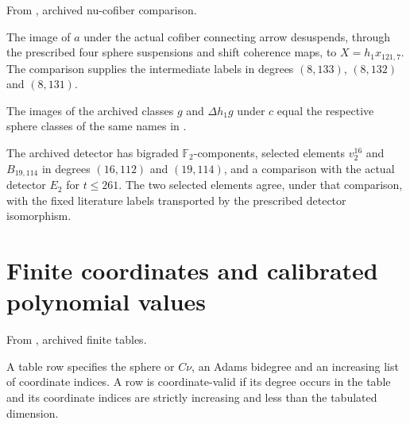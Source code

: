 \begin{theorem}
\label{sem:Computation:top-cell-comparison}
From \cite{LinProgram}, archived nu-cofiber comparison.\par
The image of $a$ under the actual cofiber connecting arrow desuspends, through the prescribed four sphere suspensions and shift coherence maps, to $X=h_1x_{121,7}$. The comparison supplies the intermediate labels in degrees $(8,133)$, $(8,132)$ and $(8,131)$.
\end{theorem}

\begin{theorem}
\label{sem:Computation:literature-labels}
The images of the archived classes $g$ and $\Delta h_1g$ under $c$ equal the respective sphere classes of the same names in \cite{LWX126}.
\end{theorem}

\begin{definition}
\label{sem:Computation:detector-comparison}
The archived detector has bigraded $\mathbb F_2$-components, selected elements $v_2^{16}$ and $B_{19,114}$ in degrees $(16,112)$ and $(19,114)$, and a comparison with the actual detector $E_2$ for $t\leq261$. The two selected elements agree, under that comparison, with the fixed literature labels transported by the prescribed detector isomorphism.
\end{definition}

\section{Finite coordinates and calibrated polynomial values}

\begin{definition}
\label{sem:Computation:table-coordinate-syntax}
From \cite{LinProgram}, archived finite tables.\par
A table row specifies the sphere or $C\nu$, an Adams bidegree and an increasing list of coordinate indices. A row is coordinate-valid if its degree occurs in the table and its coordinate indices are strictly increasing and less than the tabulated dimension.
\end{definition}

